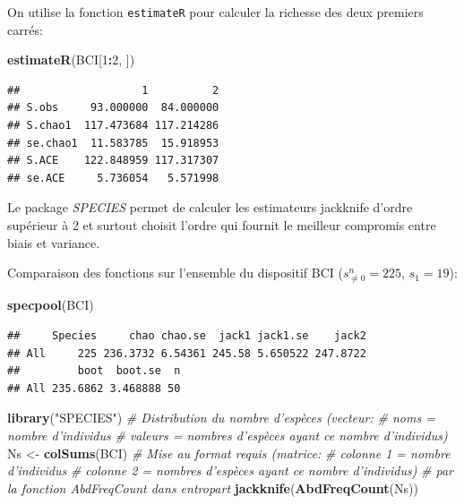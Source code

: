 \documentclass[
  11pt,
  french,
  a4paper,
  extrafontsizes,onecolumn,openright
  ]{memoir}
\newenvironment{Shaded}{\begin{snugshade}}{\end{snugshade}}
\newcommand{\CommentTok}[1]{\textcolor[rgb]{0.56,0.35,0.01}{\textit{#1}}}
\newcommand{\DecValTok}[1]{\textcolor[rgb]{0.00,0.00,0.81}{#1}}
\newcommand{\KeywordTok}[1]{\textcolor[rgb]{0.13,0.29,0.53}{\textbf{#1}}}
\newcommand{\NormalTok}[1]{#1}
\newcommand{\OperatorTok}[1]{\textcolor[rgb]{0.81,0.36,0.00}{\textbf{#1}}}
\newcommand{\StringTok}[1]{\textcolor[rgb]{0.31,0.60,0.02}{#1}}
\begin{document}
\normalsize

On utilise la fonction \texttt{estimateR} pour calculer la richesse des deux premiers carrés:

\scriptsize

\begin{Shaded}
\begin{Highlighting}[]
\KeywordTok{estimateR}\NormalTok{(BCI[}\DecValTok{1}\OperatorTok{:}\DecValTok{2}\NormalTok{, ])}
\end{Highlighting}
\end{Shaded}

\begin{verbatim}
##                   1          2
## S.obs     93.000000  84.000000
## S.chao1  117.473684 117.214286
## se.chao1  11.583785  15.918953
## S.ACE    122.848959 117.317307
## se.ACE     5.736054   5.571998
\end{verbatim}

\normalsize

Le package \emph{SPECIES} \autocite{Wang2011} permet de calculer les estimateurs jackknife d'ordre supérieur à 2 et surtout choisit l'ordre qui fournit le meilleur compromis entre biais et variance.

Comparaison des fonctions sur l'ensemble du dispositif BCI (\(s^{n}_{\ne 0}=225\), \(s_{1}=19\)):

\scriptsize

\begin{Shaded}
\begin{Highlighting}[]
\KeywordTok{specpool}\NormalTok{(BCI)}
\end{Highlighting}
\end{Shaded}

\begin{verbatim}
##     Species     chao chao.se  jack1 jack1.se    jack2
## All     225 236.3732 6.54361 245.58 5.650522 247.8722
##         boot  boot.se  n
## All 235.6862 3.468888 50
\end{verbatim}

\begin{Shaded}
\begin{Highlighting}[]
\KeywordTok{library}\NormalTok{(}\StringTok{"SPECIES"}\NormalTok{)}
\CommentTok{# Distribution du nombre d'espèces (vecteur: }
\CommentTok{# noms = nombre d'individus}
\CommentTok{# valeurs = nombres d'espèces ayant ce nombre d'individus)}
\NormalTok{Ns <-}\StringTok{ }\KeywordTok{colSums}\NormalTok{(BCI)}
\CommentTok{# Mise au format requis (matrice:}
\CommentTok{# colonne 1 = nombre d'individus}
\CommentTok{# colonne 2 = nombres d'espèces ayant ce nombre d'individus)}
\CommentTok{# par la fonction AbdFreqCount dans entropart}
\KeywordTok{jackknife}\NormalTok{(}\KeywordTok{AbdFreqCount}\NormalTok{(Ns))}
\end{Highlighting}
\end{Shaded}
\end{document}
